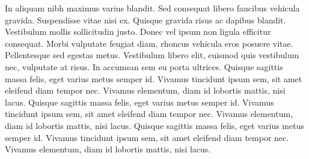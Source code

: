 In aliquam nibh maximus varius blandit. Sed consequat libero faucibus vehicula gravida. Suspendisse vitae nisi ex. Quisque gravida risus ac dapibus blandit. Vestibulum mollis sollicitudin justo. Donec vel ipsum non ligula efficitur consequat. Morbi vulputate feugiat diam, rhoncus vehicula eros posuere vitae. Pellentesque sed egestas metus. Vestibulum libero elit, euismod quis vestibulum nec, vulputate at risus. In accumsan sem eu porta ultrices. Quisque sagittis massa felis, eget varius metus semper id. Vivamus tincidunt ipsum sem, sit amet eleifend diam tempor nec. Vivamus elementum, diam id lobortis mattis, nisi lacus. Quisque sagittis massa felis, eget varius metus semper id. Vivamus tincidunt ipsum sem, sit amet eleifend diam tempor nec. Vivamus elementum, diam id lobortis mattis, nisi lacus. Quisque sagittis massa felis, eget varius metus semper id. Vivamus tincidunt ipsum sem, sit amet eleifend diam tempor nec. Vivamus elementum, diam id lobortis mattis, nisi lacus.



